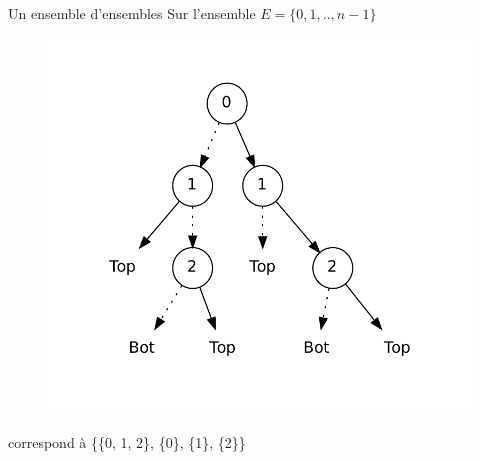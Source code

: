 \documentclass{beamer}
\begin{document}
\begin{frame}{Un ensemble d'ensembles}
Sur l'ensemble $E = \{0, 1,..,n - 1\}$
\begin{figure}[htp]
\begin{center}
\includegraphics[scale=0.3]{../imports/zdd_ex.pdf}
\end{center}
\end{figure}
correspond à \{\{0, 1, 2\}, \{0\}, \{1\}, \{2\}\}
\end{frame}
\end{document}

